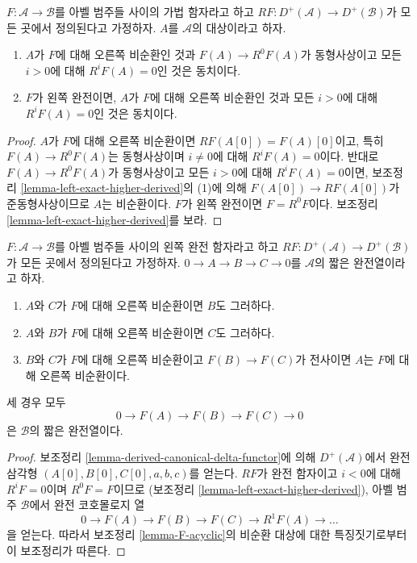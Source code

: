\begin{lemma}
\label{lemma-F-acyclic}
$F : \mathcal{A} \to \mathcal{B}$를 아벨 범주들 사이의 가법 함자라고
하고 $RF : D^{+}(\mathcal{A}) \to D^{+}(\mathcal{B})$가 모든 곳에서
정의된다고 가정하자. $A$를 $\mathcal{A}$의 대상이라고 하자.
\begin{enumerate}
\item $A$가 $F$에 대해 오른쪽 비순환인 것과
$F(A) \to R^0F(A)$가 동형사상이고 모든 $i > 0$에 대해
$R^iF(A) = 0$인 것은 동치이다.
\item $F$가 왼쪽 완전이면, $A$가 $F$에 대해 오른쪽 비순환인 것과
모든 $i > 0$에 대해 $R^iF(A) = 0$인 것은 동치이다.
\end{enumerate}
\end{lemma}

\begin{proof}
$A$가 $F$에 대해 오른쪽 비순환이면 $RF(A[0]) = F(A)[0]$이고,
특히 $F(A) \to R^0F(A)$는 동형사상이며
$i \not = 0$에 대해 $R^iF(A) = 0$이다. 반대로
$F(A) \to R^0F(A)$가 동형사상이고 모든 $i > 0$에 대해
$R^iF(A) = 0$이면, 보조정리
\ref{lemma-left-exact-higher-derived}의 (1)에 의해
$F(A[0]) \to RF(A[0])$가 준동형사상이므로 $A$는 비순환이다.
$F$가 왼쪽 완전이면 $F = R^0F$이다. 보조정리
\ref{lemma-left-exact-higher-derived}를 보라.
\end{proof}

\begin{lemma}
\label{lemma-F-acyclic-ses}
$F : \mathcal{A} \to \mathcal{B}$를 아벨 범주들 사이의 왼쪽 완전 함자라고
하고 $RF : D^{+}(\mathcal{A}) \to D^{+}(\mathcal{B})$가 모든 곳에서
정의된다고 가정하자. $0 \to A \to B \to C \to 0$를
$\mathcal{A}$의 짧은 완전열이라고 하자.
\begin{enumerate}
\item $A$와 $C$가 $F$에 대해 오른쪽 비순환이면 $B$도 그러하다.
\item $A$와 $B$가 $F$에 대해 오른쪽 비순환이면 $C$도 그러하다.
\item $B$와 $C$가 $F$에 대해 오른쪽 비순환이고
$F(B) \to F(C)$가 전사이면 $A$는 $F$에 대해 오른쪽 비순환이다.
\end{enumerate}
세 경우 모두
$$
0 \to F(A) \to F(B) \to F(C) \to 0
$$
은 $\mathcal{B}$의 짧은 완전열이다.
\end{lemma}

\begin{proof}
보조정리 \ref{lemma-derived-canonical-delta-functor}에 의해
$D^{+}(\mathcal{A})$에서 완전 삼각형
$(A[0], B[0], C[0], a, b, c)$를 얻는다. $RF$가 완전 함자이고
$i < 0$에 대해 $R^iF = 0$이며 $R^0F = F$이므로
(보조정리 \ref{lemma-left-exact-higher-derived}),
아벨 범주 $\mathcal{B}$에서 완전 코호몰로지 열
$$
0 \to F(A) \to F(B) \to F(C) \to R^1F(A) \to \ldots
$$
을 얻는다. 따라서 보조정리 \ref{lemma-F-acyclic}의 비순환 대상에 대한
특징짓기로부터 이 보조정리가 따른다.
\end{proof}


